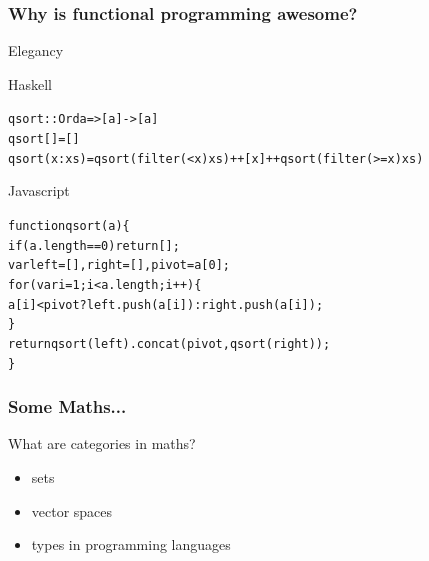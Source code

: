 \documentclass[12pt, xcolor=table]{beamer}
\begin{document}
\begin{frame}
    \frametitle{Why is functional programming awesome?}
    \begin{block}{Elegancy}
        \begin{block}{Haskell}
                \begin{alltt}
                    \begin{tiny}
                    qsort :: Ord a => [a] -> [a]
                    \newline
                    qsort []     = []
                    \newline
                    qsort (x:xs) = qsort (filter (< x) xs) ++ [x] ++ qsort (filter (>= x) xs)
                \end{tiny}
                \end{alltt}
        \end{block}
        \begin{block}{Javascript}
                \begin{alltt}
                    \begin{tiny}
                    function qsort(a) \{ \\
                        if (a.length == 0) return []; \\

                        var left = [], right = [], pivot = a[0];\\

                        for (var i = 1; i < a.length; i++) \{ \\
                            a[i] < pivot ? left.push(a[i]) : right.push(a[i]); \\
                        \} \\

                        return qsort(left).concat(pivot, qsort(right)); \\
                    \}
                    \end{tiny}
                \end{alltt}
        \end{block}
    \end{block}
\end{frame}


\begin{frame}
    \frametitle{Some Maths...}
    What are categories in maths?
    \begin{itemize}
        \item sets
        \item vector spaces
        \item types in programming languages
    \end{itemize}
\end{frame}
\end{document}

